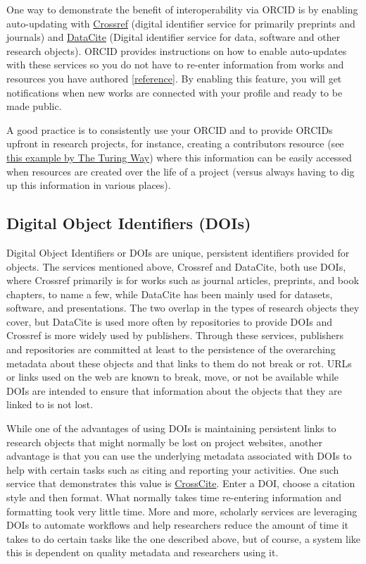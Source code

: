 \documentclass[
  letterpaper,
  DIV=11,
  numbers=noendperiod]{scrreport}
\begin{document}
One way to demonstrate the benefit of interoperability via ORCID is by
enabling auto-updating with \href{https://www.crossref.org/}{Crossref}
(digital identifier service for primarily preprints and journals) and
\href{https://datacite.org/}{DataCite} (Digital identifier service for
data, software and other research objects). ORCID provides instructions
on how to enable auto-updates with these services so you do not have to
re-enter information from works and resources you have authored
{[}\href{https://support.orcid.org/hc/en-us/articles/360006896394-Auto-updates-time-saving-and-trust-building}{reference}{]}.
By enabling this feature, you will get notifications when new works are
connected with your profile and ready to be made public.

A good practice is to consistently use your ORCID and to provide ORCIDs
upfront in research projects, for instance, creating a contributors
resource (see
\href{https://the-turing-way.netlify.app/afterword/contributors-record.html}{this
example by The Turing Way}) where this information can be easily
accessed when resources are created over the life of a project (versus
always having to dig up this information in various places).

\hypertarget{digital-object-identifiers-dois}{%
\subsection{Digital Object Identifiers
(DOIs)}\label{digital-object-identifiers-dois}}

Digital Object Identifiers or DOIs are unique, persistent identifiers
provided for objects. The services mentioned above, Crossref and
DataCite, both use DOIs, where Crossref primarily is for works such as
journal articles, preprints, and book chapters, to name a few, while
DataCite has been mainly used for datasets, software, and presentations.
The two overlap in the types of research objects they cover, but
DataCite is used more often by repositories to provide DOIs and Crossref
is more widely used by publishers. Through these services, publishers
and repositories are committed at least to the persistence of the
overarching metadata about these objects and that links to them do not
break or rot. URLs or links used on the web are known to break, move, or
not be available while DOIs are intended to ensure that information
about the objects that they are linked to is not lost.

While one of the advantages of using DOIs is maintaining persistent
links to research objects that might normally be lost on project
websites, another advantage is that you can use the underlying metadata
associated with DOIs to help with certain tasks such as citing and
reporting your activities. One such service that demonstrates this value
is \href{https://citation.crosscite.org/}{CrossCite}. Enter a DOI,
choose a citation style and then format. What normally takes time
re-entering information and formatting took very little time. More and
more, scholarly services are leveraging DOIs to automate workflows and
help researchers reduce the amount of time it takes to do certain tasks
like the one described above, but of course, a system like this is
dependent on quality metadata and researchers using it.
\end{document}
